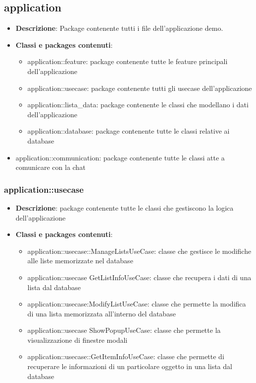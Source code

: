 \subsection{application}
\begin{itemize}
	\item \textbf{Descrizione}: Package contenente tutti i file dell'applicazione demo.
	\item \textbf{Classi e packages contenuti}:
	\begin{itemize}
		\item application::feature: package contenente tutte le feature principali dell'applicazione
		\item application::usecase: package contenente tutti gli usecase dell'applicazione
		\item application::lista\_data: package contenente le classi che modellano i dati dell'applicazione
		\item application::database: package contenente tutte le classi relative ai database
	\end{itemize}
	\item application::communication: package contenente tutte le classi atte a comunicare con la chat
\end{itemize}


\subsubsection{application::usecase}
\begin{itemize}
	\item \textbf{Descrizione}: package contenente tutte le classi che gestiscono la logica dell'applicazione
	\item \textbf{Classi e packages contenuti}:
	\begin{itemize}
	\item application::usecase::ManageListsUseCase: classe che gestisce le modifiche alle liste memorizzate nel database
	\item application::usecase GetListInfoUseCase: classe che recupera i dati di una lista dal database
	\item application::usecase:ModifyListUseCase: classe che permette la modifica di una lista memorizzata all'interno del database
	\item application::usecase ShowPopupUseCase: classe che permette la visualizzazione di finestre modali
	\item application::usecase::GetItemInfoUseCase: classe che permette di recuperare le informazioni di un particolare oggetto in una lista dal database
	\end{itemize}
\end{itemize}

